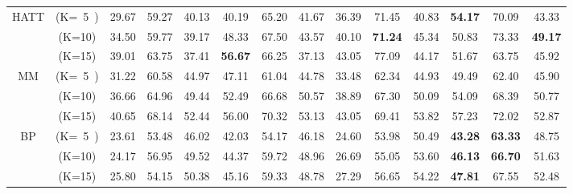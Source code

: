 \begin{table*}[th]
\begin{tabular}{|c|c|cccccc|cccccc|}
\multirow{3}{*}{HATT}
 & (K=~5~) &29.67&59.27&40.13&40.19&65.20&41.67  %
&36.39&71.45&40.83&\textbf{54.17}&70.09&43.33 \\%
 & (K=10) &34.50&59.77&39.17&48.33&67.50&43.57  %
&40.10&\textbf{71.24}&45.34&50.83&73.33&\textbf{49.17} \\%
 & (K=15) &39.01&63.75&37.41&\textbf{56.67}&66.25&37.13  %
&43.05&77.09&44.17&\textcolor[rgb]{0.45,0.45,0.45}{51.67}&\textcolor[rgb]{0.45,0.45,0.45}{63.75}&45.92  %
\\%
\hline

\multirow{3}{*}{MM}   & (K=~5~)     &31.22 &60.58 &44.97 &47.11 &61.04 &44.78 &33.48 &62.34 & \textcolor[rgb]{0.45,0.45,0.45}{44.93}&49.49 &62.40 &45.90\\
 & (K=10) & 36.66&64.96 &49.44 &52.49 &66.68 &50.57 &38.89 & 67.30& 50.09& 54.09&68.39 &50.77\\
 & (K=15) & 40.65&68.14 &52.44 &56.00 &70.32 &53.13 &43.05 & 69.41&53.82 &57.23 &72.02 & \textcolor[rgb]{0.45,0.45,0.45}{52.87}\\ \hline
\multirow{3}{*}{BP}  & (K=~5~)    & 23.61&53.48 &46.02 &42.03 & 54.17& 46.18&   24.60 &\textcolor[rgb]{0.45,0.45,0.45}{53.98}&50.49 &\textbf{43.28}&\textbf{63.33}&48.75 \\
 & (K=10) & 24.17& 56.95&49.52 &44.37 &59.72 &48.96 &26.69&\textcolor[rgb]{0.45,0.45,0.45}{55.05} &53.60 &\textbf{46.13}&\textbf{66.70} &51.63  \\
 & (K=15) & 25.80& 54.15&50.38 &45.16 &59.33 &48.78 &27.29 &56.65 &54.22&\textbf{47.81} &67.55 &52.48 \\ \hline


\end{tabular}
\end{table*}
